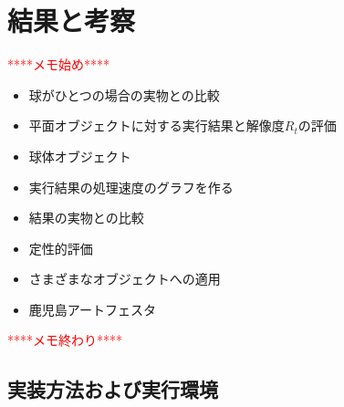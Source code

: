 \chapter{結果と考察}
\label{CResult}

\textcolor{red}{****メモ始め****}
\begin{itemize}
\item 球がひとつの場合の実物との比較
\item 平面オブジェクトに対する実行結果と解像度$R_t$の評価
\item 球体オブジェクト
\item 実行結果の処理速度のグラフを作る
\item 結果の実物との比較
\item 定性的評価
\item さまざまなオブジェクトへの適用
\item 鹿児島アートフェスタ
\end{itemize}
\textcolor{red}{****メモ終わり****}

\section{実装方法および実行環境}
\label{SEnvironment}


\section{}

